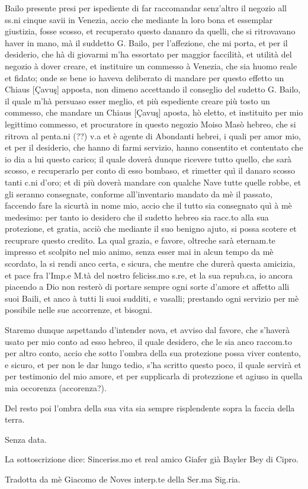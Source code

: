 Bailo presente  presi per ispediente di far  raccomandar senz'altro il
negozio all ss.ni cinque savii  in Venezia, accio che mediante la loro
bona  et  essemplar  giustizia,  fosse scosso,  et  recuperato  questo
dananro da quelli, che si ritrovavano haver in mano, mà il suddetto G.
Bailo, per l'affezione,  che mi porta, et per il  desiderio, che hà di
giovarmi m'ha essortato per  maggior faccilità, et utilità del negozio
à dover  creare, et  instituire un commesso  à Venezia, che  sia huomo
reale  et fidato; onde  se bene  io haveva  deliberato di  mandare per
questo  effetto un Chiaus  [Çavuş] apposta,  non dimeno  accettando il
conseglio del sudetto G.  Bailo,  il quale m'hà persuaso esser meglio,
et più espediente creare più  tosto un commesso, che mandare un Chiaus
[Çavuş] aposta,  hò eletto, et instituito per  mio legittimo commesso,
et procuratore in questo negozio  Moiso Masò hebreo, che si ritrova al
penta.ni (??)  v.a  et è agente di Abondanti hebrei,  i quali per amor
mio,  et  per  il  desiderio,  che  hanno  di  farmi  servizio,  hanno
consentito  et contentato che  io dia  a lui  questo carico;  il quale
doverà dunque  ricevere tutto quello,  che sarà scosso,  e recuperarlo
per conto di esso bombaso, et rimetter quì il danaro scosso tanti c.ni
d'oro; et di  più doverà mandare con qualche  Nave tutte quelle robbe,
et  gli  seranno consegnate,  conforme  all'inventario  mandato da  mè
 il passato,  faccendo fare la sicurtà in  nome mio, accio
che il tutto  sia consegnato quì à mè medesimo:  per tanto io desidero
che  il sudetto  hebreo sia  racc.to alla  sua protezione,  et gratia,
acciò che mediante il suo benigno ajuto, si possa scotere et recuprare
questo  credito. La qual  grazia, e  favore, oltreche  sarà eternam.te
impresso et scolpito nel mio animo,  senza esser mai in alcun tempo da
mè scordato, la  si rendi anco certa, e sicura,  che mentre che durerà
questa amicizia, et pace fra l'Imp.e M.tà del nostro feliciss.mo s.re,
et la  sua repub.ca, io ancora  piacendo a Dio non  resterò di portare
sempre ogni sorte d'amore et affetto  alli suoi Baili, et anco à tutti
li suoi sudditi,  e vasalli; prestando ogni servizio  per mè possibile
nelle sue accorrenze, et bisogni.

Staremo dunque  aspettando d'intender nova, et avviso  dal favore, che
s'haverà usato per mio conto ad esso hebreo, il quale desidero, che le
sia anco raccom.to per altro  conto, accio che sotto l'ombra della sua
protezione possa  viver contento,  e sicuro, et  per non le  dar lungo
tedio, s'ha  scritto questo poco,  il quale servirà et  per testimonio
del mio amore,  et per supplicarla di protezzione  et agiuso in quella
mia  occorenza (accorenza?).

Del resto poi l'ombra della  sua vita sia sempre risplendente sopra la
faccia della terra.

Senza data.

La sottoscrizione  dice: Sinceriss.mo et real amico  Giafer già Bayler
Bey di Cipro.

Tradotta da mè Giacomo de Noves interp.te della Ser.ma Sig.ria.

